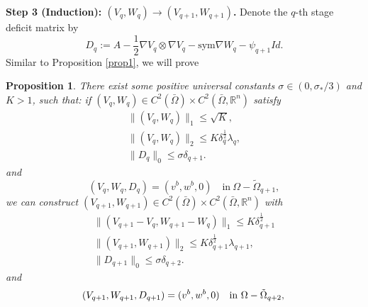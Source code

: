 \documentclass[reqno,12pt]{amsart}
\numberwithin{equation}{section}
\theoremstyle{plain}
\newtheorem{prop}[thm]{Proposition}
\theoremstyle{definition}
\newtheorem{rem}[thm]{Remark}
\newcommand{\R}{\mathbb{R}}
\newcommand{\sym}{\text{sym}}
\begin{document}
\textbf{Step 3 (Induction): $(V_q,W_q)\to(V_{q+1},W_{q+1})$.} 
Denote the $q$-th stage deficit matrix by
\begin{equation}\label{ccc}
   D_q:= A-\frac{1}{2}\nabla V_q\otimes\nabla V_q-\sym\nabla W_q-\psi_{q+1}Id.
\end{equation}
Similar to Proposition \ref{prop1}, we will prove
\begin{prop}\label{prop2}
    There exist some positive universal constants $\sigma\in(0,\sigma_*/3)$ and $K>1$, such that: if $(V_q,W_q)\in C^2(\bar\Omega)\times C^2(\bar\Omega,\R^n)$ satisfy
    \begin{gather}
         \|(V_q,W_q)\|_1\le \sqrt K, \label{prop2.a1}\\
         \|(V_q,W_q)\|_2\le K\delta_q^\frac{1}{2}\lambda_q, \label{prop2.a2}\\
         \|D_q\|_0\le{\sigma}\delta_{q+1}.\label{prop2.a3}
    \end{gather}
    and
    \begin{equation}\label{prop2.a4}
        (V_q,W_q,D_q)=(v^b,w^b,0)\quad\text{in}\ \Omega-\tilde\Omega_{q+1},
    \end{equation}
    we can construct $(V_{q+1},W_{q+1})\in C^2(\bar\Omega)\times C^2(\bar\Omega,\R^n)$ with
    \begin{gather}
        \|(V_{q+1}-V_q, W_{q+1}-W_q)\|_1\le K\delta_{q+1}^\frac{1}{2}\label{prop2.0}\\
        \|(V_{q+1},W_{q+1})\|_2\le K\delta_{q+1}^\frac{1}{2}\lambda_{q+1},\label{prop2.1}\\
         \|D_{q+1}\|_0\le{\sigma}\delta_{q+2}.\label{prop2.2}
    \end{gather}
    and
    \begin{equation}\label{prop2.4}
        (V_{q+1},W_{q+1},D_{q+1})=(v^b,w^b,0)\quad\text{in}\ \Omega-\tilde\Omega_{q+2},\\
    \end{equation}
\end{prop}

\end{document}
